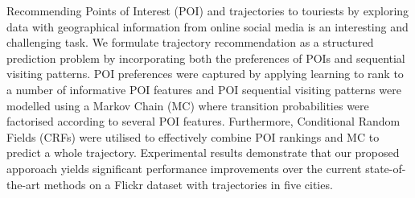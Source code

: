 Recommending Points of Interest (POI) and trajectories to touriests by exploring data with 
geographical information from online social media is an interesting and challenging task.
We formulate trajectory recommendation as a structured prediction problem by incorporating 
both the preferences of POIs and sequential visiting patterns.
POI preferences were captured by applying learning to rank to a number of informative POI features
and POI sequential visiting patterns were modelled using a Markov Chain (MC) where transition 
probabilities were factorised according to several POI features.
Furthermore, Conditional Random Fields (CRFs) were utilised to effectively combine POI rankings
and MC to predict a whole trajectory.
Experimental results demonstrate that our proposed apporoach yields significant performance improvements 
over the current state-of-the-art methods on a Flickr dataset with trajectories in five cities.

